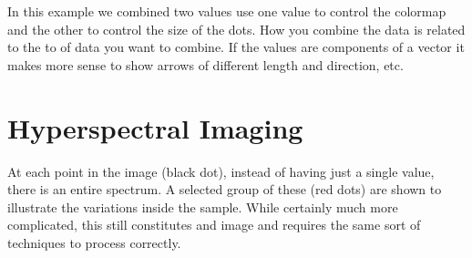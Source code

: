 \documentclass[letterpaper,10pt,english]{sphinxmanual}
\begin{document}
\sphinxAtStartPar
In this example we combined two values use one value to control the colormap and the other to control the size of the dots. How you combine the data is related to the to of data you want to combine. If the values are components of a vector it makes more sense to show arrows of different length and direction, etc.

\begin{sphinxVerbatim}[commandchars=\\\{\}]
    
\PYG{p}{[}\PYG{p}{]} \PYG{p}{[}\PYG{p}{]}   \PYG{p}{[}\PYG{p}{]}   \PYG{p}{[}\PYG{p}{]}
\end{sphinxVerbatim}


\section{Hyperspectral Imaging}
\label{\detokenize{01-Introduction:hyperspectral-imaging}}
\sphinxAtStartPar
At each point in the image (black dot), instead of having just a single value, there is an entire spectrum. A selected group of these (red dots) are shown to illustrate the variations inside the sample. While certainly much more complicated, this still constitutes and image and requires the same sort of techniques to process correctly.
\end{document}

